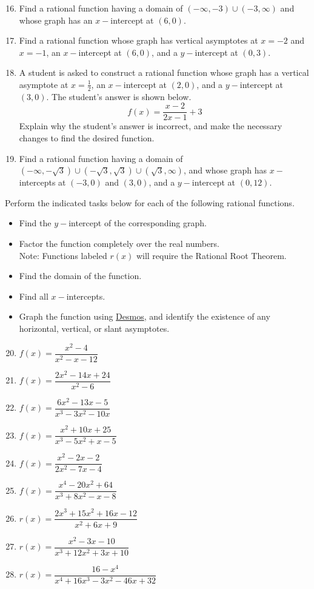 \documentclass[12pt]{book}
\theoremstyle{definition}
\newcommand{\Desmos}{\href{https://www.desmos.com/}{Desmos}}
\begin{document}
			\begin{enumerate}
			\setcounter{enumi}{15}
			\item\label{construct_rat_function1} Find a rational function having a domain of $(-\infty,-3)\cup(-3,\infty)$ and whose graph has an $x-$intercept at $(6,0)$.
			\item Find a rational function whose graph has vertical asymptotes at $x=-2$ and $x=-1$, an $x-$intercept at $(6,0)$, and a $y-$intercept at $(0,3)$.
			\item A student is asked to construct a rational function whose graph has a vertical asymptote at $x=\frac{1}{2}$, an $x-$intercept at $(2,0)$, and a $y-$intercept at $(3,0)$.  The student's answer is shown below.
			$$f(x)=\dfrac{x-2}{2x-1}+3$$
			Explain why the student's answer is incorrect, and make the necessary changes to find the desired function.
			\item\label{construct_rat_function2} Find a rational function having a domain of $(-\infty,-\sqrt{3})\cup(-\sqrt{3},\sqrt{3})\cup(\sqrt{3},\infty)$, and whose graph has $x-$intercepts at $(-3,0)$ and $(3,0)$, and a $y-$intercept at $(0,12)$.
		\end{enumerate}
Perform the indicated tasks below for each of the following rational functions.
		\begin{itemize}
			\item Find the $y-$intercept of the corresponding graph.
			\item Factor the function completely over the real numbers.\\
			Note: Functions labeled $r(x)$ will require the Rational Root Theorem.
			\item Find the domain of the function.
			\item Find all $x-$intercepts.
			\item Graph the function using \Desmos, and identify the existence of any horizontal, vertical, or slant asymptotes.
		\end{itemize}
		\begin{multicols}{2}
			\begin{enumerate}
			\setcounter{enumi}{19}
				\item $f(x)=\dfrac{x^2-4}{x^2-x-12}$
				\item $f(x)=\dfrac{2x^2-14x+24}{x^2-6}$
				\item $f(x)=\dfrac{6x^2-13x-5}{x^3-3x^2-10x}$
				\item $f(x)=\dfrac{x^2+10x+25}{x^3-5x^2+x-5}$
				\item $f(x)=\dfrac{x^2-2x-2}{2x^2-7x-4}$
				\item $f(x)=\dfrac{x^4-20x^2+64}{x^3+8x^2-x-8}$
				\item $r(x)=\dfrac{2x^3+15x^2+16x-12}{x^2+6x+9}$
				\item $r(x)=\dfrac{x^2-3x-10}{x^3+12x^2+3x+10}$
				\item $r(x)=\dfrac{16-x^4}{x^4+16x^3-3x^2-46x+32}$
			\end{enumerate}
		\end{multicols}
\end{document}
